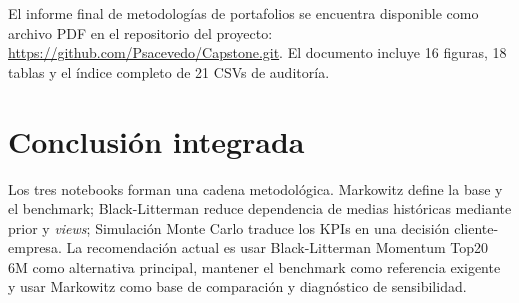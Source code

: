 El informe final de metodolog\'ias de portafolios se encuentra disponible como
archivo PDF en el repositorio del proyecto:
\url{https://github.com/Psacevedo/Capstone.git}. El documento incluye
16 figuras, 18 tablas y el \'indice completo de 21 CSVs de auditor\'ia.

\section*{Conclusi\'on integrada}

Los tres notebooks forman una cadena metodol\'ogica. Markowitz define la base y
el benchmark; Black-Litterman reduce dependencia de medias hist\'oricas mediante
prior y \textit{views}; Simulaci\'on Monte Carlo traduce los KPIs en una decisi\'on
cliente-empresa. La recomendaci\'on actual es usar Black-Litterman Momentum Top20
6M como alternativa principal, mantener el benchmark como referencia exigente y
usar Markowitz como base de comparaci\'on y diagn\'ostico de sensibilidad.
